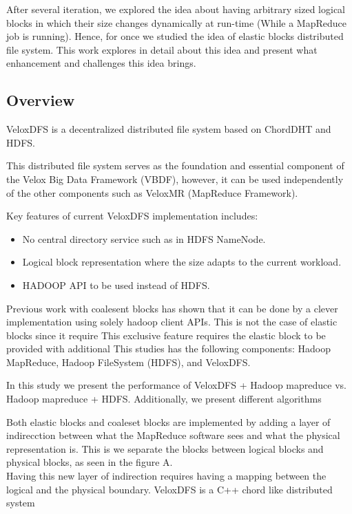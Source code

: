 After several iteration, we explored the idea about having arbitrary sized logical blocks in which their size changes dynamically at run-time (While a MapReduce job is running). Hence, for once we studied the idea of elastic blocks distributed file system. This work explores in detail about this idea and present what enhancement and challenges this idea brings.

\subsection{Overview}
VeloxDFS is a decentralized distributed file system based on ChordDHT and HDFS.


This distributed file system serves as the foundation and essential component of the Velox Big Data Framework (VBDF), however, it can be used independently of the other components such as VeloxMR (MapReduce Framework).

Key features of current VeloxDFS implementation includes:
\begin{itemize}
\item No central directory service such as in HDFS NameNode.
\item Logical block representation where the size adapts to the current workload.
\item HADOOP API to be used instead of HDFS.
\end{itemize}

Previous work with coalesent blocks has shown that it can be done by a clever implementation using solely hadoop client APIs. This is not the case of elastic blocks since it require
This exclusive feature requires the elastic block to be provided with additional
This studies has the following components: Hadoop MapReduce, Hadoop FileSystem (HDFS), and VeloxDFS. 

In this study we present the performance of VeloxDFS + Hadoop mapreduce vs. Hadoop mapreduce + HDFS. Additionally, we present different algorithms 

Both elastic blocks and coaleset blocks are implemented by adding a layer of indirecction between what the MapReduce software sees and what the physical representation is. This is we separate the blocks between logical blocks and physical blocks, as seen in the figure A. \\
Having this new layer of indirection requires having a mapping between the logical and the physical boundary. 
VeloxDFS is a C++ chord like distributed system 


